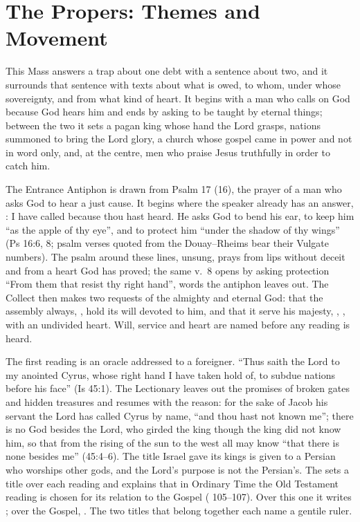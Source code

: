 
\section{The Propers: Themes and Movement}

This Mass answers a trap about one debt with a sentence about two, and it
surrounds that sentence with texts about what is owed, to whom, under whose
sovereignty, and from what kind of heart. It begins with a man who calls on
God because God hears him and ends by asking to be taught by eternal things;
between the two it sets a pagan king whose hand the Lord grasps, nations
summoned to bring the Lord glory, a church whose gospel came in power and not
in word only, and, at the centre, men who praise Jesus truthfully in order to
catch him.

The Entrance Antiphon is drawn from Psalm 17 (16), the prayer of a man who
asks God to hear a just cause. It begins where the speaker already has an
answer, : I have called because
thou hast heard. He asks God to bend his ear, to keep him ``as the apple of
thy eye'', and to protect him ``under the shadow of thy wings'' (Ps 16:6, 8;
psalm verses quoted from the Douay--Rheims bear their Vulgate numbers).
The psalm around these lines, unsung, prays from lips without deceit and from
a heart God has proved; the same v.~8 opens by asking protection ``From them
that resist thy right hand'', words the antiphon leaves out. The Collect then
makes two requests of the almighty and eternal God: that the assembly always,
, hold its will devoted to him, and that it serve his majesty,
, , with an undivided heart. Will,
service and heart are named before any reading is heard.

The first reading is an oracle addressed to a foreigner. ``Thus saith the Lord
to my anointed Cyrus, whose right hand I have taken hold of, to subdue nations
before his face'' (Is 45:1). The Lectionary leaves out the promises of broken
gates and hidden treasures and resumes with the reason: for the sake of Jacob
his servant the Lord has called Cyrus by name, ``and thou hast not known me'';
there is no God besides the Lord, who girded the king though the king did not
know him, so that from the rising of the sun to the west all may know ``that
there is none besides me'' (45:4--6). The title Israel gave its kings is given
to a Persian who worships other gods, and the Lord's purpose is not the
Persian's. The  sets a title over each reading and
explains that in Ordinary Time the Old Testament reading is chosen for its
relation to the Gospel ( 105--107). Over this one it writes
; over the
Gospel, . The
two titles that belong together each name a gentile ruler.

